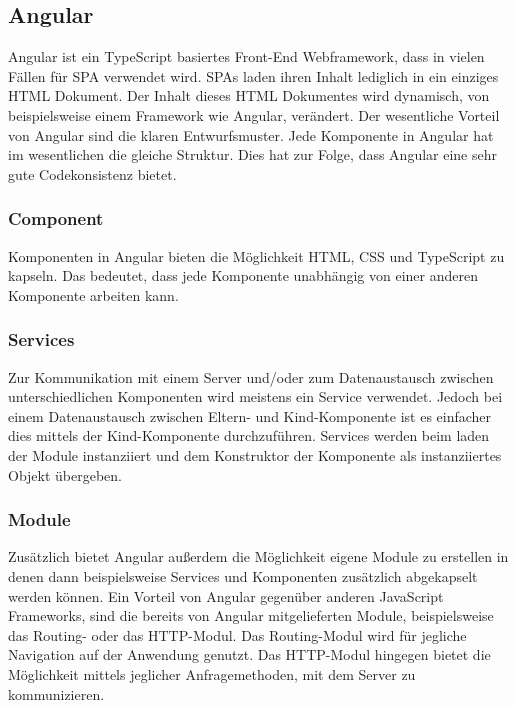 \documentclass[11pt]{article}
\begin{document}
	\subsection{Angular}
	\label{sec: angular}
	Angular ist ein TypeScript basiertes Front-End Webframework, dass in vielen Fällen für \gls{SPA} verwendet wird. \gls{SPA}s laden ihren Inhalt lediglich in ein einziges \gls{HTML} Dokument. Der Inhalt dieses \gls{HTML} Dokumentes wird dynamisch, von beispielsweise einem Framework wie Angular, verändert. Der wesentliche Vorteil von Angular sind die klaren Entwurfsmuster. Jede Komponente in Angular hat im wesentlichen die gleiche Struktur. Dies hat zur Folge, dass Angular eine sehr gute Codekonsistenz bietet.
	
	
	\subsubsection{Component}
	\label{sec: ang-component}
	Komponenten in Angular bieten die Möglichkeit \gls{HTML}, \gls{CSS} und TypeScript zu kapseln. Das bedeutet, dass jede Komponente unabhängig von einer anderen Komponente arbeiten kann.
	
	\subsubsection{Services}
	\label{sec: ang-service}
	Zur Kommunikation mit einem Server und/oder zum Datenaustausch zwischen unterschiedlichen Komponenten wird meistens ein Service verwendet. Jedoch bei einem Datenaustausch zwischen Eltern- und Kind-Komponente ist es einfacher dies mittels der Kind-Komponente durchzuführen. Services werden beim laden der Module instanziiert und dem Konstruktor der Komponente als instanziiertes Objekt übergeben.
	
	\subsubsection{Module}
	\label{sec: ang-modul}
	Zusätzlich bietet Angular außerdem die Möglichkeit eigene Module zu erstellen in denen dann beispielsweise Services und Komponenten zusätzlich abgekapselt werden können. Ein Vorteil von Angular gegenüber anderen JavaScript Frameworks, sind die bereits von Angular mitgelieferten Module, beispielsweise das Routing- oder das HTTP-Modul. Das Routing-Modul wird für jegliche Navigation auf der Anwendung genutzt. Das \gls{HTTP}-Modul hingegen bietet die Möglichkeit mittels jeglicher Anfragemethoden, mit dem Server zu kommunizieren.
	
\end{document}
